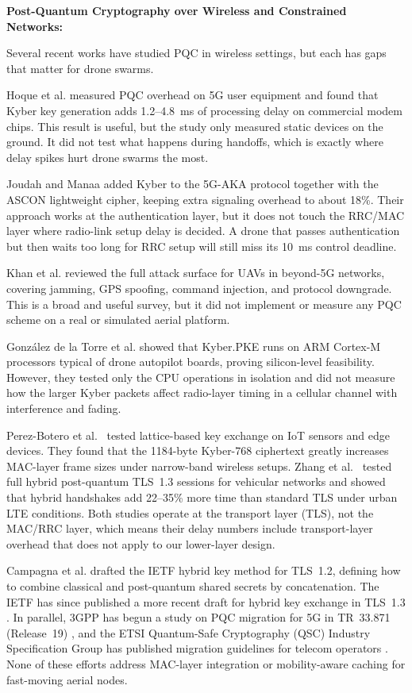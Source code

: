 \documentclass{ieeeaccess}
\begin{document}
\vspace{2mm}\noindent\textbf{Post-Quantum Cryptography over Wireless and Constrained Networks:}

Several recent works have studied PQC in wireless settings, but each has gaps that matter for drone swarms.

Hoque et al. \cite{ref1} measured PQC overhead on 5G user equipment and found that Kyber key generation adds 1.2--4.8~ms of processing delay on commercial modem chips. This result is useful, but the study only measured static devices on the ground. It did not test what happens during handoffs, which is exactly where delay spikes hurt drone swarms the most.

Joudah and Manaa \cite{ref2} added Kyber to the 5G-AKA protocol together with the ASCON lightweight cipher, keeping extra signaling overhead to about 18\%. Their approach works at the authentication layer, but it does not touch the RRC/MAC layer where radio-link setup delay is decided. A drone that passes authentication but then waits too long for RRC setup will still miss its 10~ms control deadline.

Khan et al. \cite{ref3} reviewed the full attack surface for UAVs in beyond-5G networks, covering jamming, GPS spoofing, command injection, and protocol downgrade. This is a broad and useful survey, but it did not implement or measure any PQC scheme on a real or simulated aerial platform.

Gonz\'{a}lez de la Torre et al. \cite{ref4} showed that Kyber.PKE runs on ARM Cortex-M processors typical of drone autopilot boards, proving silicon-level feasibility. However, they tested only the CPU operations in isolation and did not measure how the larger Kyber packets affect radio-layer timing in a cellular channel with interference and fading.

Perez-Botero et al.~\cite{ref22} tested lattice-based key exchange on IoT sensors and edge devices. They found that the 1184-byte Kyber-768 ciphertext greatly increases MAC-layer frame sizes under narrow-band wireless setups. Zhang et al.~\cite{ref23} tested full hybrid post-quantum TLS~1.3 sessions for vehicular networks and showed that hybrid handshakes add 22--35\% more time than standard TLS under urban LTE conditions. Both studies operate at the transport layer (TLS), not the MAC/RRC layer, which means their delay numbers include transport-layer overhead that does not apply to our lower-layer design.

Campagna et al. \cite{ref24} drafted the IETF hybrid key method for TLS~1.2, defining how to combine classical and post-quantum shared secrets by concatenation. The IETF has since published a more recent draft for hybrid key exchange in TLS~1.3 \cite{ref27}. In parallel, 3GPP has begun a study on PQC migration for 5G in TR~33.871 (Release~19) \cite{ref28}, and the ETSI Quantum-Safe Cryptography (QSC) Industry Specification Group has published migration guidelines for telecom operators \cite{ref31}. None of these efforts address MAC-layer integration or mobility-aware caching for fast-moving aerial nodes.
\end{document}
